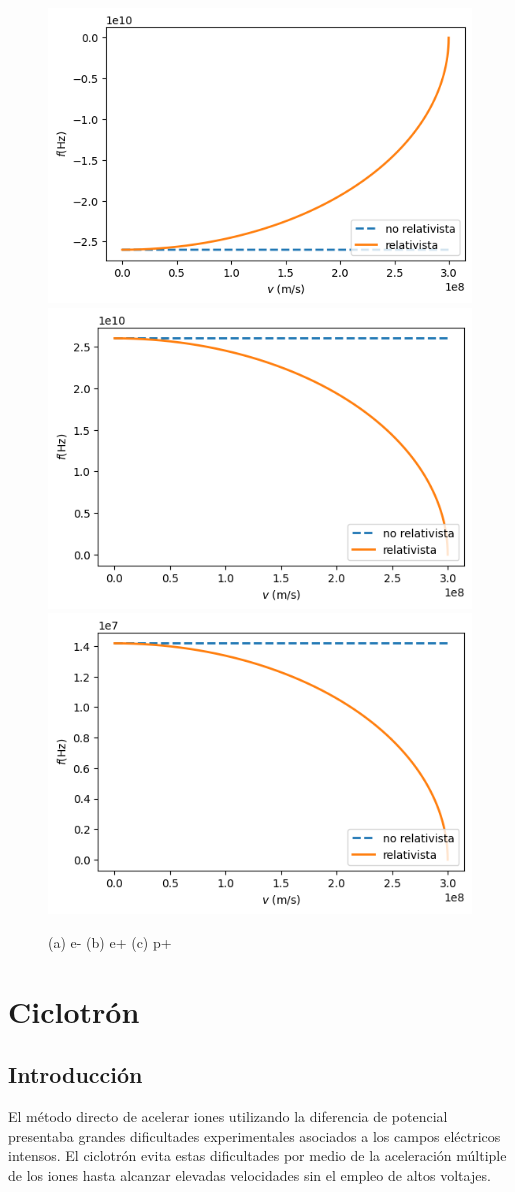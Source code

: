\documentclass{article}
\begin{document}
\begin{figure}[h]
    \centering
    \includegraphics[width=.36\textwidth]{e-.png}
    \label{$e^-$}
    \includegraphics[width=.36\textwidth]{e+.png}
    \label{$e^+$}
    \includegraphics[width=.36\textwidth]{p+.png}
    \label{$p^+$}
    \caption{(a) e- (b) e+ (c) p+
    }
    \label{fig:foobar}
\end{figure}

\clearpage

\section{Ciclotrón}
\hfill
\subsection{Introducción}
El método directo de acelerar iones utilizando la diferencia de potencial presentaba grandes dificultades experimentales asociados a los campos eléctricos intensos. El ciclotrón evita estas dificultades por medio de la aceleración múltiple de los iones hasta alcanzar elevadas velocidades sin el empleo de altos voltajes.\\
\end{document}
